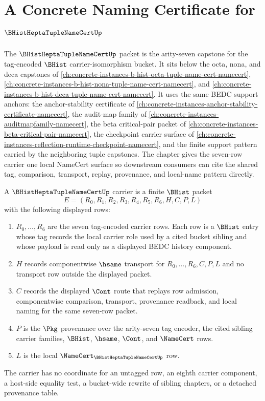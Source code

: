 \chapter{A Concrete Naming Certificate for $\BHistHeptaTupleNameCertUp$}
\label{ch:concrete-instances-b-hist-hepta-tuple-name-cert-namecert}

The $\BHistHeptaTupleNameCertUp$ packet is the arity-seven capstone for the tag-encoded $\BHist$ carrier-isomorphism bucket. It sits below the octa, nona, and deca capstones of \autoref{ch:concrete-instances-b-hist-octa-tuple-name-cert-namecert}, \autoref{ch:concrete-instances-b-hist-nona-tuple-name-cert-namecert}, and \autoref{ch:concrete-instances-b-hist-deca-tuple-name-cert-namecert}. It uses the same BEDC support anchors: the anchor-stability certificate of \autoref{ch:concrete-instances-anchor-stability-certificate-namecert}, the audit-map family of \autoref{ch:concrete-instances-auditmapfamily-namecert}, the beta critical-pair packet of \autoref{ch:concrete-instances-beta-critical-pair-namecert}, the checkpoint carrier surface of \autoref{ch:concrete-instances-reflection-runtime-checkpoint-namecert}, and the finite support pattern carried by the neighboring tuple capstones. The chapter gives the seven-row carrier one local NameCert surface so downstream consumers can cite the shared tag, comparison, transport, replay, provenance, and local-name pattern directly.

\begin{definition}
\label{def:b-hist-hepta-tuple-name-cert-carrier}
A $\BHistHeptaTupleNameCertUp$ carrier is a finite $\BHist$ packet
$$
E=(R_0,R_1,R_2,R_3,R_4,R_5,R_6,H,C,P,L)
$$
with the following displayed rows:
\begin{enumerate}
\item $R_0,\ldots,R_6$ are the seven tag-encoded carrier rows. Each row is a $\BHist$ entry whose tag records the local carrier role used by a cited bucket sibling and whose payload is read only as a displayed BEDC history component.
\item $H$ records componentwise $\hsame$ transport for $R_0,\ldots,R_6,C,P,L$ and no transport row outside the displayed packet.
\item $C$ records the displayed $\Cont$ route that replays row admission, componentwise comparison, transport, provenance readback, and local naming for the same seven-row packet.
\item $P$ is the $\Pkg$ provenance over the arity-seven tag encoder, the cited sibling carrier families, $\BHist$, $\hsame$, $\Cont$, and $\NameCert$ rows.
\item $L$ is the local $\NameCert_{\BHistHeptaTupleNameCertUp}$ row.
\end{enumerate}
The carrier has no coordinate for an untagged row, an eighth carrier component, a host-side equality test, a bucket-wide rewrite of sibling chapters, or a detached provenance table.
\end{definition}

